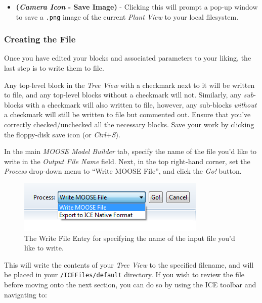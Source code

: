 \begin{itemize}
\itemsep1pt\parskip0pt
\item
  \textbf{(\emph{Camera Icon} - Save Image)} - Clicking this will prompt
  a pop-up window to save a \texttt{.png} image of the current
  \emph{Plant View} to your local filesystem.
\end{itemize}

\subsubsection{Creating the File}\label{creating-the-file}

Once you have edited your blocks and associated parameters to your
liking, the last step is to write them to file.

Any top-level block in the \emph{Tree View} with a checkmark next to it
will be written to file, and any top-level blocks without a checkmark
will not. Similarly, any \emph{sub}-blocks with a checkmark will also
written to file, however, any sub-blocks \emph{without} a checkmark will
still be written to file but commented out. Ensure that you've correctly
checked/unchecked all the necessary blocks. Save your work by clicking
the floppy-disk save icon (or \emph{Ctrl}+\emph{S}).

In the main \emph{MOOSE Model Builder} tab, specify the name of the file
you'd like to write in the \emph{Output File Name} field. Next, in the
top right-hand corner, set the \emph{Process} drop-down menu to ``Write
MOOSE File'', and click the \emph{Go!} button.

\begin{figure}[htbp]
\centering
\includegraphics[width=\textwidth]{figures/ICE_MOOSEWriteFile.png}
\caption{The Write File Entry for specifying the name of the input file you'd like to write.}
\end{figure}

This will write the contents of your \emph{Tree View} to the specified
filename, and will be placed in your \texttt{/ICEFiles/default}
directory. If you wish to review the file before moving onto the next
section, you can do so by using the ICE toolbar and navigating to:

